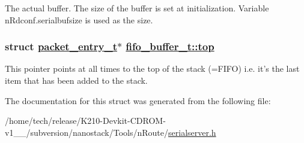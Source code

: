 The actual buffer. The size of the buffer is set at initialization. Variable n\-Rdconf.serialbufsize is used as the size. \hypertarget{structfifo__buffer__t_5daee039d39228d2a6346711d6d07bf4}{
\subsubsection[top]{\setlength{\rightskip}{0pt plus 5cm}struct \hyperlink{structpacket__entry__t}{packet\_\-entry\_\-t}$\ast$ \hyperlink{structfifo__buffer__t_5daee039d39228d2a6346711d6d07bf4}{fifo\_\-buffer\_\-t::top}}}
\label{structfifo__buffer__t_5daee039d39228d2a6346711d6d07bf4}


This pointer points at all times to the top of the stack (=FIFO) i.e. it's the last item that has been added to the stack. 

The documentation for this struct was generated from the following file:\begin{CompactItemize}
\item 
/home/tech/release/K210-Devkit-CDROM-v1\_\_/subversion/nanostack/Tools/n\-Route/\hyperlink{serialserver_8h}{serialserver.h}\end{CompactItemize}
